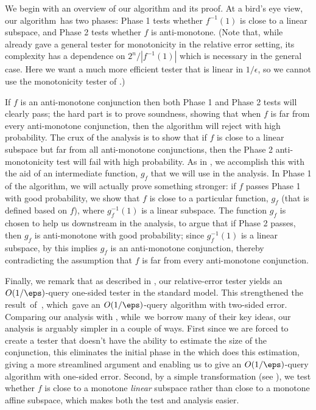\documentclass[11pt]{article}
\theoremstyle{definition}
\begin{document}
We begin with an overview of our algorithm and its proof.
At a bird's eye view, our algorithm~has two phases: Phase 1  tests whether $f^{-1}(1)$ is close to a linear subspace, and Phase 2 tests whether $f$ is anti-monotone.  
(Note that, while \cite{CDHLNSY2024} already gave a general tester for monotonicity in the relative error setting, its complexity has a dependence on $2^n/|f^{-1}(1)|$ which is necessary in the general case.  Here we want a much more efficient tester that is linear in $1/\epsilon$, so we cannot use the monotonicity tester of \cite{CDHLNSY2024}.)

If $f$ is an anti-monotone conjunction then both Phase 1 and Phase 2 tests will clearly pass; the hard part is to prove soundness, showing that when $f$ is far from every anti-monotone conjunction, then the algorithm will reject with high probability.
The crux of the analysis is to show that if $f$ is close to a linear subspace but far from all anti-monotone conjunctions, then the Phase 2 anti-monotonicity test will fail with high probability.
As in \cite{PRS02}, we accomplish this with the aid of an intermediate function, $g_f$ that we will use in the analysis.
In Phase 1 of the algorithm,  we will actually prove something stronger: if $f$ passes Phase 1 with good probability, we show that $f$ is close to a particular function, $g_f$ (that is defined based on $f$), where $g_f^{-1}(1)$ is a linear subspace. 
The function $g_f$ is chosen to help us downstream in the analysis, to argue that if Phase 2 passes, then $g_f$ is anti-monotone  with good probability; since $g_f^{-1}(1)$ is a linear subspace, by  this implies $g_f$ is an anti-monotone conjunction,
thereby contradicting the assumption that $f$ is far from every anti-monotone conjunction.


Finally, we remark that as described in , our relative-error tester yields an $O(1/\eps)$-query one-sided tester in the standard model.  This strengthened the result~of~\cite{PRS02}, which~gave an $O(1/\eps)$-query algorithm with two-sided error. Comparing our analysis with \cite{PRS02},  while~we borrow many of their key ideas, our analysis is arguably simpler in a couple of ways.   First since we are forced to create a tester that doesn't have the ability to estimate the size of the conjunction, this eliminates the initial phase in the \cite{PRS02} which does this estimation, giving a more streamlined argument {and enabling us to give an $O(1/\eps)$-query algorithm with one-sided error.} Second, by a simple transformation (see  ), we test whether $f$ is close to a monotone {\it linear} subspace rather than close to a monotone affine subspace, which makes both the test and analysis easier. 
\end{document}
